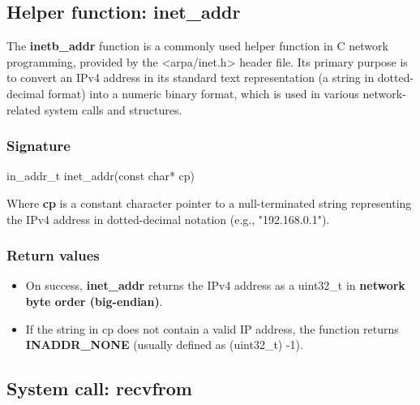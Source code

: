 \documentclass{report}
\begin{document}
    \bigbreak \noindent 
    \subsection{Helper function: inet\_addr}
    \bigbreak \noindent 
    The \textbf{inetb\_addr} function is a commonly used helper function in C network programming, provided by the <arpa/inet.h> header file. Its primary purpose is to convert an IPv4 address in its standard text representation (a string in dotted-decimal format) into a numeric binary format, which is used in various network-related system calls and structures.
    \bigbreak \noindent 
    \subsubsection{Signature}
    \begin{cppcode}
     in_addr_t inet_addr(const char* cp) 
    \end{cppcode}
    \bigbreak \noindent 
    Where \textbf{cp} is a constant character pointer to a null-terminated string representing the IPv4 address in dotted-decimal notation (e.g., "192.168.0.1").
    \bigbreak \noindent 
    \subsubsection{Return values}
    \bigbreak \noindent 
    \begin{itemize}
        \item On success, \textbf{inet\_addr} returns the IPv4 address as a uint32\_t in \textbf{network byte order (big-endian)}.
        \item If the string in cp does not contain a valid IP address, the function returns \textbf{INADDR\_NONE} (usually defined as (uint32\_t) -1).
    \end{itemize}

    \bigbreak \noindent 
    \subsection{System call: recvfrom}
    \bigbreak \noindent 
\end{document}
